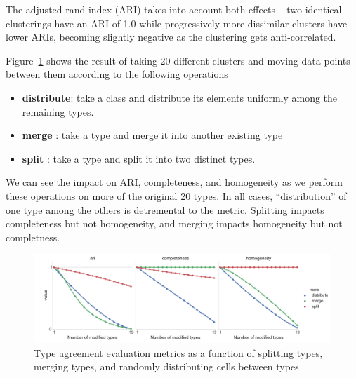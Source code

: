 \documentclass{article}
\begin{document}
The adjusted rand index (ARI) takes into account both effects
\autocite{Hubert1985} -- two identical clusterings have an ARI of 1.0
while progressively more dissimilar clusters have lower ARIs, becoming
slightly negative as the clustering gets anti-correlated.

Figure~\ref{fig:s:comparison} shows the result of taking 20 different clusters
and moving data points between them according to the following operations
\begin{itemize}
\item \textbf{distribute}: take a class and distribute its elements
  uniformly among the remaining types.
\item \textbf{merge} : take a type and merge it into another existing
  type
\item \textbf{split} : take a type and split it into two distinct
  types.
\end{itemize}

We can see the impact on ARI, completeness, and homogeneity as we
perform these operations on more of the original 20 types. In all
cases, ``distribution'' of one type among the others is detremental to
the metric. Splitting impacts completeness but not homogeneity, and
merging impacts homogeneity but not completness.



\begin{figure}
  \centering 
  \centerline{\includegraphics[width=180mm]{cluster_metric_comparison.pdf}}
  \caption{Type agreement evaluation metrics as a function of splitting types, merging types, and randomly distributing cells between types}
  \label{fig:s:comparison}
\end{figure}
\end{document}
